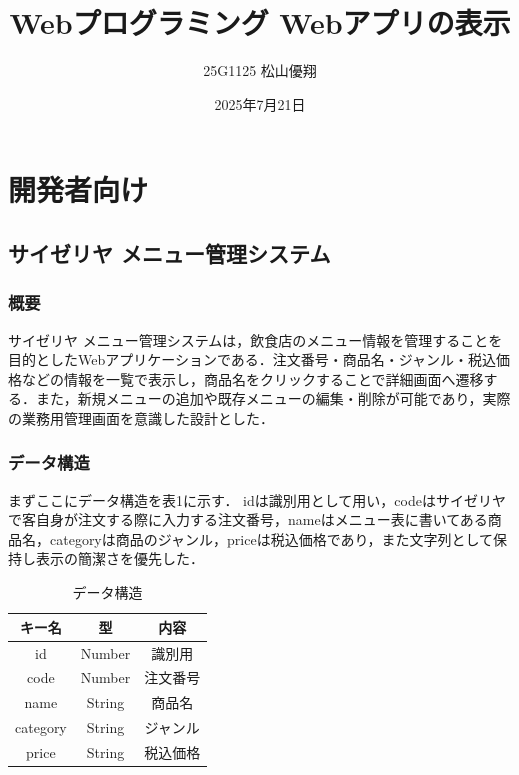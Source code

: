\documentclass[uplatex,dvipdfmx]{jsarticle}
\begin{document}
\title{Webプログラミング Webアプリの表示}
\author{25G1125 松山優翔}
\date{2025年7月21日}
\maketitle

\section{開発者向け}

\subsection{サイゼリヤ メニュー管理システム}

\subsubsection{概要}
サイゼリヤ メニュー管理システムは，飲食店のメニュー情報を管理することを目的としたWebアプリケーションである．注文番号・商品名・ジャンル・税込価格などの情報を一覧で表示し，商品名をクリックすることで詳細画面へ遷移する．また，新規メニューの追加や既存メニューの編集・削除が可能であり，実際の業務用管理画面を意識した設計とした．

\subsubsection{データ構造}
まずここにデータ構造を表1に示す．
idは識別用として用い，codeはサイゼリヤで客自身が注文する際に入力する注文番号，nameはメニュー表に書いてある商品名，categoryは商品のジャンル，priceは税込価格であり，また文字列として保持し表示の簡潔さを優先した．

\begin{table}[H]
    \centering
    \caption{データ構造}
    \label{tab:pulse_comparison}
    \setlength{\extrarowheight}{3pt} 
    \begin{tabular}{|c|c|c|}
        \hline
        キー名 & 型 & 内容 \\
        \hline
        id & Number & 識別用 \\
        \hline
        code & Number & 注文番号 \\
        \hline
        name & String & 商品名 \\
        \hline
        category & String & ジャンル \\
        \hline
        price & String & 税込価格 \\
        \hline
     \end{tabular}
\end{table}
\end{document}
